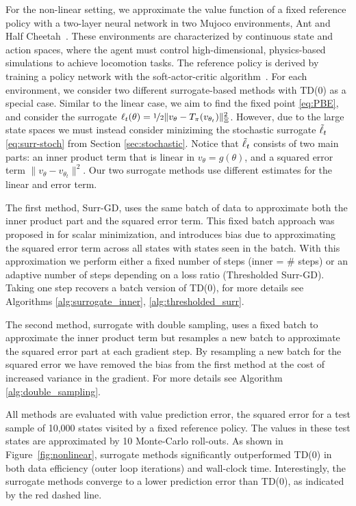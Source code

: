 \documentclass{article} %
\theoremstyle{definition}
\begin{document}
For the non-linear setting, we approximate the value function of a fixed reference policy with a two-layer neural network in two Mujoco environments, Ant and Half Cheetah~\citep{todorov2012mujoco}. These environments are characterized by continuous state and action spaces, where the agent must control high-dimensional, physics-based simulations to achieve locomotion tasks. The reference policy is derived by training a policy network with the soft-actor-critic algorithm~\citep{haarnoja2018soft}.
For each environment, we consider two different surrogate-based methods with TD(0) as a special case.
Similar to the linear case, we aim to find the fixed point \eqref{eq:PBE}, and consider the surrogate $\ell_t(\theta) = \nicefrac{1}{2}\|v_{\theta}-T_{\pi}(v_{\theta_t})\|_{\Xi}^2$.
However, due to the large state spaces we must instead consider miniziming the stochastic surrogate $\Tilde{\ell}_t$ \eqref{eq:surr-stoch} from Section \ref{sec:stochastic}.
Notice that $\Tilde{\ell}_t$ consists of two main parts: an inner product term that is linear in $v_{\theta} =g(\theta)$, and a squared error term $\|v_{\theta}- v_{\theta_t}\|^2$.
Our two surrogate methods use  different estimates for the linear and error term.

The first method, Surr-GD, uses the same batch of data to approximate both the inner product part and the squared error term.
This fixed batch approach was proposed in \citet{lavington2023target} for scalar minimization, and introduces bias due to approximating the squared error term across all states with states seen in the batch.
With this approximation we perform either a fixed number of steps (inner = $\#$ steps) or an adaptive number of steps depending on a loss ratio (Thresholded Surr-GD).
Taking one step recovers a batch version of TD(0), for more details see Algorithms \ref{alg:surrogate_inner},  \ref{alg:thresholded_surr}.

The second method, surrogate with double sampling, uses a fixed batch to approximate the inner product term but resamples a new batch to approximate the squared error part at each gradient step.
By resampling a new batch for the squared error we have removed the bias from the first method at the cost of increased variance in the gradient.
For more details see Algorithm \ref{alg:double_sampling}.

All methods are evaluated with value prediction error, the squared error for a test sample of 10,000 states visited by a fixed reference policy.
The values in these test states are approximated by 10 Monte-Carlo roll-outs.
As shown in Figure~\ref{fig:nonlinear}, surrogate methods significantly outperformed TD(0) in both data efficiency (outer loop iterations) and wall-clock time.
Interestingly, the surrogate methods converge to a lower prediction error than TD(0), as indicated by the red dashed line. 
\end{document}
